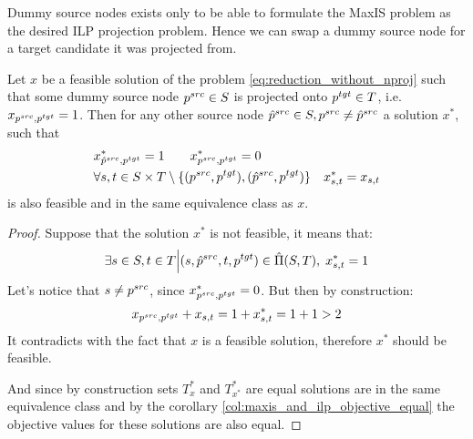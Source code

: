 Dummy source nodes exists only to be able to formulate the MaxIS problem as the desired ILP projection problem.
Hence we can swap a dummy source node for a target candidate it was projected from.
\begin{lemma} \label{lemma:swap_source_reduction}
    Let \( x \) be a feasible solution of the problem \eqref{eq:reduction_without_nproj} such that
    some dummy source node \( p^{src} \in S \) is projected onto \( p^{tgt} \in T \),
    i.e. \( x_{p^{src}, p^{tgt}} = 1 \). Then for any other source node
    \( \hat{p}^{src} \in S, p^{src} \neq \hat{p}^{src} \) a solution \( x^{*} \), such that
    \begin{align*}
         & x^*_{\hat{p}^{src}, p^{tgt}} = 1  \qquad
        x^*_{p^{src}, p^{tgt}} = 0                                                                                            \\
         & \forall s, t \in S \times T \setminus \{ (p^{src}, p^{tgt}), (\hat{p}^{src}, p^{tgt}) \} \quad x^*_{s,t} = x_{s,t}
    \end{align*}
    is also feasible and in the same equivalence class as \( x \).
\end{lemma}
\begin{proof}
    Suppose that the solution \( x^* \) is not feasible, it means that:
    \[
        \exists s \in S, t \in T \Big| (s, \hat{p}^{src}, t, p^{tgt}) \in \hat{\Pi}(S, T), \; x^*_{s, t} = 1
    \]
    Let's notice that \( s \neq p^{src} \), since \( x^*_{p^{src}, p^{tgt}} = 0 \).
    But then by construction:
    \[
        x_{p^{src}, p^{tgt}} + x_{s, t} = 1 + x^*_{s, t} = 1 + 1 > 2
    \]
    It contradicts with the fact that \( x \) is a feasible solution, therefore \( x^* \) should be
    feasible.

    And since by construction sets \( T^*_x \) and \( T^*_{x^*} \) are equal solutions are in the same equivalence
    class and by the corollary \ref{col:maxis_and_ilp_objective_equal} the objective values for these solutions are also equal.
\end{proof}

